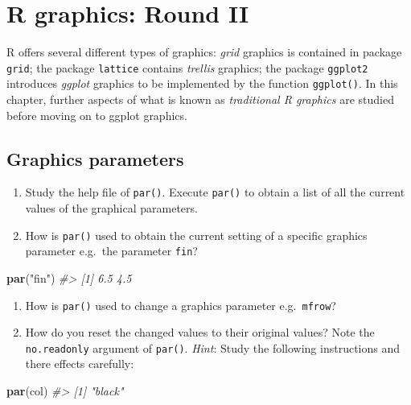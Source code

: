 \documentclass[
]{book}
\newenvironment{Shaded}{\begin{snugshade}}{\end{snugshade}}
\newcommand{\CommentTok}[1]{\textcolor[rgb]{0.56,0.35,0.01}{\textit{#1}}}
\newcommand{\FunctionTok}[1]{\textcolor[rgb]{0.13,0.29,0.53}{\textbf{#1}}}
\newcommand{\NormalTok}[1]{#1}
\newcommand{\StringTok}[1]{\textcolor[rgb]{0.31,0.60,0.02}{#1}}
\begin{document}
\chapter{R graphics: Round II}\label{graphics2}

R offers several different types of graphics: \emph{{grid}} graphics is contained in package \texttt{grid}; the package \texttt{lattice} contains \emph{{trellis}} graphics; the package \texttt{ggplot2} introduces \emph{{ggplot}} graphics to be implemented by the function \texttt{ggplot()}. In this chapter, further aspects of what is known as \emph{traditional R graphics} are studied before moving on to ggplot graphics.

\section{Graphics parameters}\label{graphics-parameters}

\begin{enumerate}
\def\labelenumi{(\alph{enumi})}
\item
  Study the help file of \texttt{par()}. Execute \texttt{par()} to obtain a list of all the current values of the graphical parameters.
\item
  How is \texttt{par()} used to obtain the current setting of a specific graphics parameter e.g.~the parameter \texttt{fin}?
\end{enumerate}

\begin{Shaded}
\begin{Highlighting}[]
\FunctionTok{par}\NormalTok{(}\StringTok{"fin"}\NormalTok{)}
\CommentTok{\#\textgreater{} [1] 6.5 4.5}
\end{Highlighting}
\end{Shaded}

\begin{enumerate}
\def\labelenumi{(\alph{enumi})}
\setcounter{enumi}{2}
\item
  How is \texttt{par()} used to change a graphics parameter e.g.~\texttt{mfrow}?
\item
  How do you reset the changed values to their original values? Note the \texttt{no.readonly} argument of \texttt{par()}. \emph{Hint}: Study the following instructions and there effects carefully:
\end{enumerate}

\begin{Shaded}
\begin{Highlighting}[]
\FunctionTok{par}\NormalTok{(}\StringTok{\textquotesingle{}col\textquotesingle{}}\NormalTok{)}
\CommentTok{\#\textgreater{} [1] "black"}
\end{Highlighting}
\end{Shaded}
\end{document}
